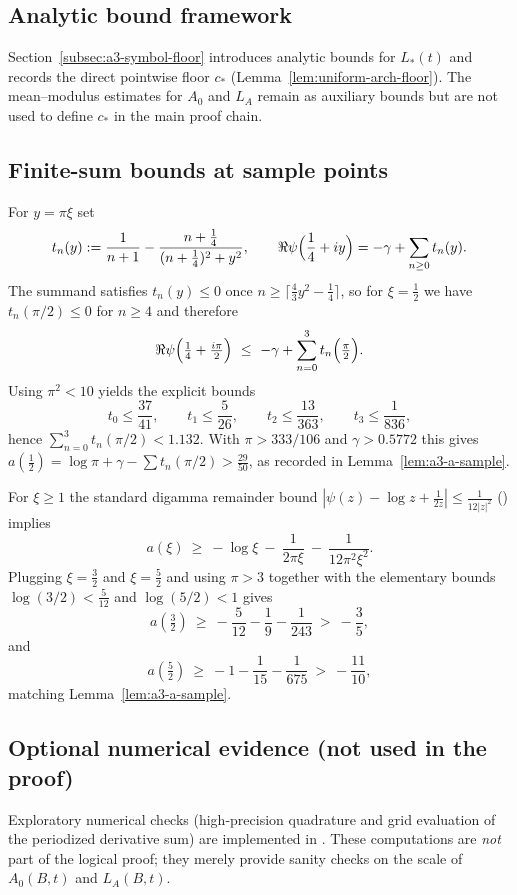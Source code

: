 \subsection{Analytic bound framework}

Section~\ref{subsec:a3-symbol-floor} introduces analytic bounds for $L_*(t)$
and records the direct pointwise floor $c_*$ (Lemma~\ref{lem:uniform-arch-floor}). The
mean--modulus estimates for $A_0$ and $L_A$ remain as auxiliary bounds but are not used
to define $c_*$ in the main proof chain.

\subsection{Finite-sum bounds at sample points}\label{app:digamma-sample}
For $y=\pi\xi$ set
\[
  t_n(y):=\frac{1}{n+1}-\frac{n+\tfrac14}{(n+\tfrac14)^2+y^2},
\qquad
  \Re\psi\Bigl(\frac14+i y\Bigr)
  = -\gamma + \sum_{n\ge0} t_n(y).
\]
The summand satisfies $t_n(y)\le0$ once
$n\ge \lceil \tfrac43 y^2-\tfrac14\rceil$, so for $\xi=\tfrac12$ we have
$t_n(\pi/2)\le0$ for $n\ge4$ and therefore
\[
  \Re\psi\Bigl(\tfrac14+\tfrac{i\pi}{2}\Bigr)\ \le\ -\gamma + \sum_{n=0}^3 t_n\Bigl(\tfrac{\pi}{2}\Bigr).
\]
Using $\pi^2<10$ yields the explicit bounds
\[
  t_0\le \frac{37}{41},\qquad
  t_1\le \frac{5}{26},\qquad
  t_2\le \frac{13}{363},\qquad
  t_3\le \frac{1}{836},
\]
hence $\sum_{n=0}^3 t_n(\pi/2)<1.132$. With $\pi>333/106$ and $\gamma>0.5772$ this gives
$a(\tfrac12)=\log\pi+\gamma-\sum t_n(\pi/2)>\frac{29}{50}$, as recorded in
Lemma~\ref{lem:a3-a-sample}.

For $\xi\ge1$ the standard digamma remainder bound
\(
|\psi(z)-\log z+\tfrac{1}{2z}|\le \frac{1}{12|z|^2}
\)
(\cite[\S5.11]{NISTDLMF}) implies
\[
  a(\xi)\ \ge\ -\log\xi\ -\ \frac{1}{2\pi\xi}\ -\ \frac{1}{12\pi^2\xi^2}.
\]
Plugging $\xi=\tfrac32$ and $\xi=\tfrac52$ and using $\pi>3$ together with
the elementary bounds $\log(3/2)<\tfrac{5}{12}$ and $\log(5/2)<1$ gives
\[
  a(\tfrac32)\ \ge\ -\frac{5}{12}-\frac{1}{9}-\frac{1}{243}\ >\ -\frac35,
\]
and
\[
  a(\tfrac52)\ \ge\ -1-\frac{1}{15}-\frac{1}{675}\ >\ -\frac{11}{10},
\]
matching Lemma~\ref{lem:a3-a-sample}.

\subsection{Optional numerical evidence (not used in the proof)}

Exploratory numerical checks (high-precision quadrature and grid evaluation of the periodized derivative sum)
are implemented in . These computations are \emph{not} part of the logical proof;
they merely provide sanity checks on the scale of $A_0(B,t)$ and $L_A(B,t)$.
